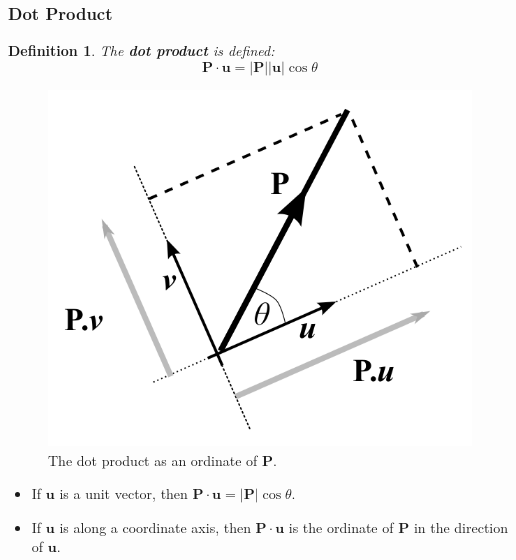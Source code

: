 \documentclass[11pt]{article}
\newtheorem{defn}{Definition}
\begin{document}
\subsubsection{Dot Product}
\begin{defn}
  The \textbf{dot product} is defined:
  \[
    \bm{P} \cdot \bm{u} = \lvert \bm{P} \rvert \lvert \bm{u} \rvert \cos \theta  
  \]
\end{defn}

\begin{figure}[htb!]
  \caption{The dot product as an ordinate of $\bm{P}$.}
  \includegraphics[scale=0.2]{dotproduct}
  \centering
\end{figure}

\begin{itemize}
  \item If $\bm{u}$ is a unit vector, then $\bm{P} \cdot \bm{u} = \lvert \bm{P} \rvert \cos \theta$.
  \item If $\bm{u}$ is along a coordinate axis, then $\bm{P} \cdot \bm{u}$ is the ordinate of $\bm{P}$ in the direction of $\bm{u}$.
\end{itemize}
\end{document}
